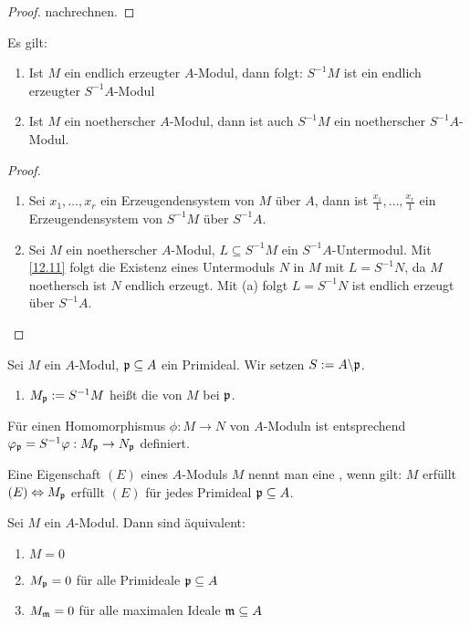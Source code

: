 \begin{proof}
	nachrechnen.
\end{proof}
\begin{fo} \label{12.12}
	Es gilt: 
	\begin{enumerate} [label= \alph*)]
		\item Ist $M$ ein endlich erzeugter $A$-Modul, dann folgt: $S^{-1}M $ ist ein endlich erzeugter $S^{-1}A$-Modul
		\item Ist $M$ ein  noetherscher $A$-Modul, dann ist auch $S^{-1}M$ ein noetherscher $S^{-1}A$-Modul. 
	\end{enumerate}
\end{fo}
\begin{proof}
	\begin{enumerate}
		\item Sei $x_1,\dots,x_r $ ein Erzeugendensystem von $M$ über $A$, dann ist $ \frac{x_1}{1}, \dots, \frac{x_r}{1} $ ein Erzeugendensystem von $S^{-1}M$ über $S^{-1}A$.
		\item Sei $M$ ein noetherscher $A$-Modul, $L \subseteq S^{-1}M $ ein $S^{-1}A$-Untermodul. Mit \ref{12.11} folgt die Existenz eines Untermoduls $N$ in $M$ mit $ L = S^{-1}N $, da $M$ noethersch ist $N$ endlich erzeugt. Mit (a) folgt $L = S^{-1}N$ ist endlich erzeugt über $S^{-1}A$.
	\end{enumerate}
\end{proof}
\begin{df} \label{12.13}
	Sei $M$ ein $A$-Modul, $\mathfrak{p} \subseteq A $ ein Primideal. Wir setzen $S := A \backslash \mathfrak{p}$.
	\begin{enumerate}
		\item[] $M_{\mathfrak{p}} := S^{-1}M $ heißt die  von $M$ bei $\mathfrak{p}$.
	\end{enumerate}  Für einen Homomorphismus $\phi: M \to N $ von $A$-Moduln ist entsprechend $\varphi_{\mathfrak{p}} = S^{-1}\varphi: M_{\mathfrak{p}} \to N_{\mathfrak{p}} $ definiert. 
\end{df}
\begin{anm}
	Eine Eigenschaft $(E)$ eines $A$-Moduls $M$ nennt man eine , wenn gilt: $M$ erfüllt $(E) \Leftrightarrow M_{\mathfrak{p}} $ erfüllt $(E)$ für jedes Primideal $ \mathfrak{p} \subseteq A $. 
\end{anm}
\begin{sa} \label{12.14}
	Sei $M$ ein $A$-Modul. Dann sind äquivalent: 
	\begin{enumerate} [label= \roman*)]
		\item $M = 0$
		\item $M_{\mathfrak{p}} = 0 $ für alle Primideale $\mathfrak{p} \subseteq A$ 
		\item $M_{\mathfrak{m}} = 0 $ für alle maximalen Ideale $\mathfrak{m} \subseteq A $
	\end{enumerate}
\end{sa}
